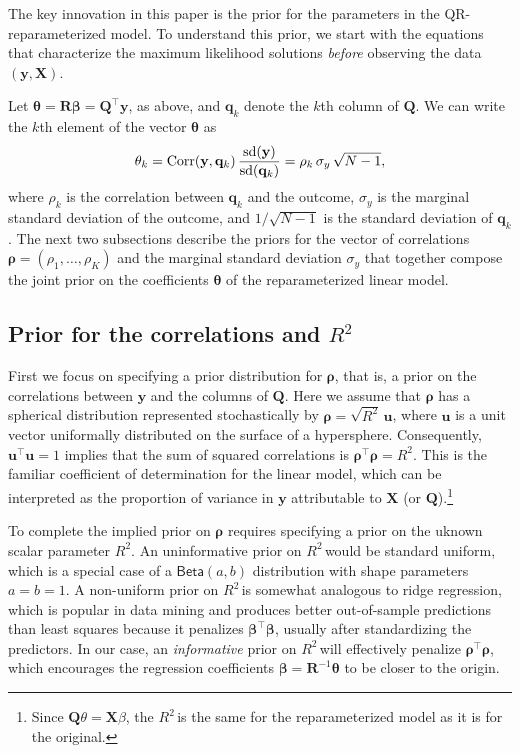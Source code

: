 \documentclass[11pt]{article}
\newcommand{\Rsq}{$R^2\,$}
\newcommand{\boldrho}{\boldsymbol{\rho}}
\newcommand{\boldbeta}{\boldsymbol{\beta}}
\newcommand{\boldtheta}{\boldsymbol{\theta}}
\newcommand{\X}{\mathbf{X}}
\newcommand{\y}{\mathbf{y}}
\newcommand{\Q}{\mathbf{Q}}
\newcommand{\R}{\mathbf{R}}
\renewcommand{\u}{\mathbf{u}}
\newcommand{\Betadist}[2]{\mathsf{Beta}\left(#1,#2\right)}
\begin{document}
The key innovation in this paper is the prior for the parameters in the
QR-reparameterized model. To understand this prior, we start with the equations
that characterize the maximum likelihood solutions \emph{before} observing the
data $\left(\y, \X\right)$.

Let $\boldtheta = \R\boldbeta = \Q^\top \y$, as above, and $\mathbf{q}_k$ denote
the $k$th column of $\Q$. We can write the $k$th element of the vector
$\boldtheta$ as
%
$$\theta_k
  = {\rm Corr}(\y, \mathbf{q}_k) \, \frac{{\rm sd}(\y)}{{\rm sd}(\mathbf{q}_k)}
  = \rho_k \, \sigma_y \, \sqrt{N - 1},
$$
%
where $\rho_k$ is the correlation between $\mathbf{q}_k$ and the outcome,
$\sigma_y$ is the marginal standard deviation of the outcome, and $1/\sqrt{N-1}$
is the standard deviation of $\mathbf{q}_k$. The next two subsections describe
the priors for the vector of correlations $\boldrho = (\rho_1, \dots, \rho_K)$
and the marginal standard deviation $\sigma_y$ that together compose the joint
prior on the coefficients $\boldtheta$ of the reparameterized linear model.

\subsection{Prior for the correlations and \Rsq}
First we focus on specifying a prior distribution for $\boldrho$, that is, a
prior on the correlations between $\y$ and the columns of $\Q$. Here we assume
that $\boldrho$ has a spherical distribution represented stochastically by
$\boldrho = \sqrt{R^2} \, \u$, where $\u$ is a unit vector uniformally
distributed on the surface of a hypersphere. Consequently, $\u^\top\u = 1$
implies that the sum of squared correlations is $\boldrho^\top \boldrho = R^2$.
This is the familiar coefficient of determination for the linear model, which
can be interpreted as the proportion of variance in $\y$ attributable to $\X$
(or $\Q$).\footnote{Since $\Q\theta = \X\beta$, the \Rsq is the same for the
reparameterized model as it is for the original.}

To complete the implied prior on $\boldrho$ requires specifying a prior on the
uknown scalar parameter $R^2$. An uninformative prior on \Rsq would be standard
uniform, which is a special case of a $\Betadist{a}{b}$ distribution with shape
parameters $a = b = 1$. A non-uniform prior on \Rsq is somewhat analogous to
ridge regression, which is popular in data mining and produces better
out-of-sample predictions than least squares because it penalizes
$\boldbeta^\top \boldbeta$, usually after standardizing the predictors. In our
case, an \emph{informative} prior on \Rsq will effectively penalize
$\boldrho^\top \boldrho$, which encourages the regression coefficients
$\boldbeta = \R^{-1} \boldtheta$ to be closer to the origin.
\end{document}
